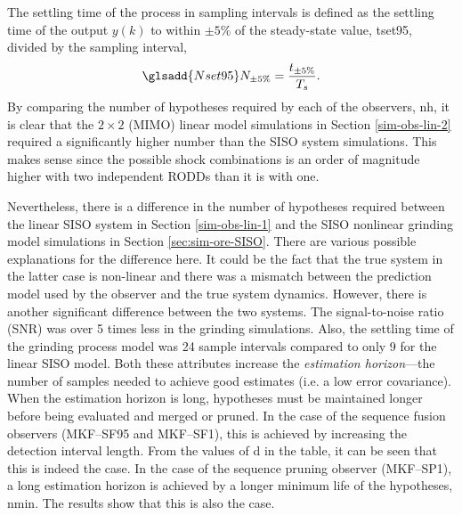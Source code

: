 The settling time of the process in sampling intervals is defined as the settling time of the output $y(k)$ to within $\pm5\%$ of the steady-state value, \gls{tset95}, divided by the sampling interval,
\begin{equation} \label{eq:Nsettle}
	\glsadd{Nset95}N_{\pm 5\%}=\frac{t_{\pm 5\%}}{T_s}.
\end{equation}
By comparing the number of hypotheses required by each of the observers, \gls{nh}, it is clear that the $2 \times 2$ (\gls{MIMO}) linear model simulations in Section \ref{sim-obs-lin-2} required a significantly higher number than the \gls{SISO} system simulations. This makes sense since the possible shock combinations is an order of magnitude higher with two independent \gls{RODD}s than it is with one.

Nevertheless, there is a difference in the number of hypotheses required between the linear \gls{SISO} system in Section \ref{sim-obs-lin-1} and the \gls{SISO} nonlinear grinding model simulations in Section \ref{sec:sim-ore-SISO}. There are various possible explanations for the difference here. It could be the fact that the true system in the latter case is non-linear and there was a mismatch between the prediction model used by the observer and the true system dynamics. However, there is another significant difference between the two systems. The signal-to-noise ratio (\gls{SNR}) was over 5 times less in the grinding simulations. Also, the settling time of the grinding process model was 24 sample intervals compared to only 9 for the linear \gls{SISO} model. Both these attributes increase the \textit{estimation horizon}---the number of samples needed to achieve good estimates (i.e. a low error covariance). When the estimation horizon is long, hypotheses must be maintained longer before being evaluated and merged or pruned. In the case of the sequence fusion observers (MKF--SF95 and MKF--SF1), this is achieved by increasing the detection interval length. From the values of \gls{d} in the table, it can be seen that this is indeed the case. In the case of the sequence pruning observer (MKF--SP1), a long estimation horizon is achieved by a longer minimum life of the hypotheses, \gls{nmin}. The results show that this is also the case.

